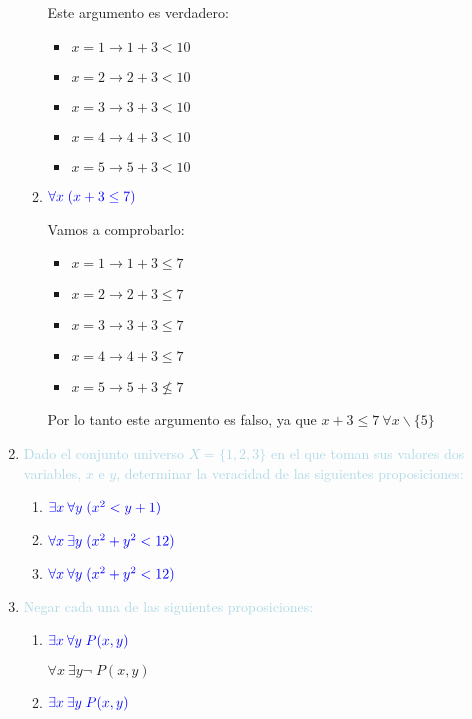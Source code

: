 \documentclass[12pt]{article}
\newcommand{\lb}[1]{\textcolor{lightblue}{#1}}
\newcommand{\db}[1]{\textcolor{blue}{#1}}
\begin{document}
\begin{enumerate}[label=\color{red}\textbf{\arabic*)}, leftmargin=*]
\begin{enumerate}[label=\color{red}\alph*)]
            Este argumento es verdadero:
            \begin{itemize}[label=$-$]
                  \item $x=1\longrightarrow 1+3<10$
                  \item $x=2\longrightarrow 2+3<10$
                  \item $x=3\longrightarrow 3+3<10$
                  \item $x=4\longrightarrow 4+3<10$
                  \item $x=5\longrightarrow 5+3<10$
            \end{itemize}
            \item $\db{\forall x\;(x+3\le7)}$
            
            Vamos a comprobarlo:
            \begin{itemize}[label=$-$]
                  \item $x=1\longrightarrow 1+3\le7$
                  \item $x=2\longrightarrow 2+3\le7$
                  \item $x=3\longrightarrow 3+3\le7$
                  \item $x=4\longrightarrow 4+3\le7$
                  \item $x=5\longrightarrow 5+3\nleq7$
            \end{itemize}
            Por lo tanto este argumento es falso, ya que $x+3\le 7\:\forall x\backslash\{5\}$
      \end{enumerate}
      \item \lb{Dado el conjunto universo $X=\{1,2,3\}$ en el que toman sus valores dos variables, $x$ e $y$, determinar la veracidad de las siguientes proposiciones:}
      \begin{enumerate}[label=\color{red}\alph*)]
            \item $\db{\exists x\:\forall y\;(x^2<y+1)}$
            \item $\db{\forall x\:\exists y\;(x^2+y^2<12)}$
            \item $\db{\forall x\:\forall y\;(x^2+y^2<12)}$
      \end{enumerate}
      \item \lb{Negar cada una de las siguientes proposiciones:}
      \begin{enumerate}[label=\color{red}\alph*)]
            \item $\db{\exists x\:\forall y\;P(x,y)}$
            
            $\forall x\:\exists y\neg\;P(x,y)$
            \item $\db{\exists x\:\exists y\;P(x,y)}$
            

\end{enumerate}
\end{enumerate}
\end{document}
